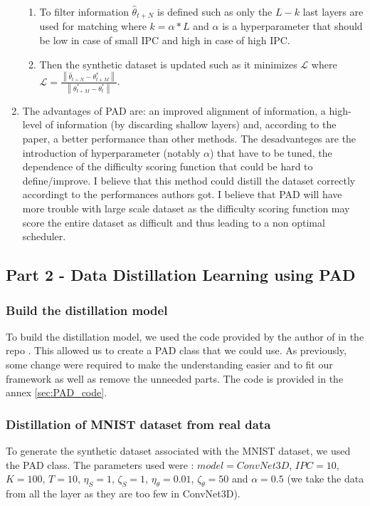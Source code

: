 \documentclass[onecolumn]{IEEEtran}
\begin{document}
\begin{enumerate}[label=(\alph*)]
\begin{enumerate}[label=(\arabic*)]
        \item To filter information $\hat\theta_{t+N}$ is defined such as only the $L-k$ last layers are used for matching where $k=\alpha*L$ and $\alpha$ is a hyperparameter that should be low in case of small IPC and high in case of high IPC.
        \item Then the synthetic dataset is updated such as it minimizes $\mathcal{L}$ where $\mathcal{L}=\frac{\left\|\hat\theta_{t+N}-\theta^*_{t+M}\right\|}{\left\|\theta^*_{t+M}-\theta^*_t\right\|}$.
    \end{enumerate}
    \vspace{3mm}
    \item The advantages of PAD are: an improved alignment of information, a high-level of information (by discarding shallow layers) and, according to the paper, a better performance than other methods. The desadvanteges are the introduction of hyperparameter (notably $\alpha$) that have to be tuned, the dependence of the difficulty scoring function that could be hard to define/improve. I believe that this method could distill the dataset correctly accordingt to the performances authors got. I believe that PAD will have more trouble with large scale dataset as the difficulty scoring function may score the entire dataset as difficult and thus leading to a non optimal scheduler.
\end{enumerate}

\subsection{Part 2 - Data Distillation Learning using PAD}
\subsubsection{Build the distillation model}
To build the distillation model, we used the code provided by the author of \cite{li2024prioritize} in the repo \cite{githubGitHubNUSHPCAILabPAD}. This allowed us to create a PAD class that we could use. As previously, some change were required to make the understanding easier and to fit our framework as well as remove the unneeded parts. The code is provided in the annex \ref{sec:PAD_code}.

\subsubsection{Distillation of MNIST dataset from real data}
To generate the synthetic dataset associated with the MNIST dataset, we used the PAD class. The parameters used were : $model = ConvNet3D$, $IPC = 10$, $K=100$, $T=10$, $\eta_S = 1$, $\zeta_S = 1$, $\eta_\theta = 0.01$, $\zeta_\theta=50$ and $\alpha=0.5$ (we take the data from all the layer as they are too few in ConvNet3D).
\end{document}
